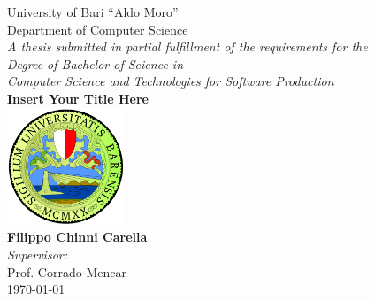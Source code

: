 \documentclass[12pt,twoside]{book}
\begin{document}

\frontmatter

\begin{titlepage}


\begin{center}
{\LARGE University of Bari ``Aldo Moro''}\\[0.25cm]
{\Large Department of Computer Science}\\[1cm]
{\large \emph{A thesis submitted in partial fulfillment of the requirements for the\\Degree of Bachelor of Science in\\Computer Science and Technologies for Software Production}}\\[2.5cm]
\linespread{1.2}\huge {\bfseries Insert Your Title Here}\\[1.5cm]
\linespread{1}
\includegraphics[width=3.5cm]{images/uniba-logo.png}\\[1.5cm]
{\Large\bf Filippo Chinni Carella}\\[1cm]
\large \emph{Supervisor:}\\
Prof. Corrado Mencar\\[1cm] 
\vspace{\fill}
\today
\end{center}

\end{titlepage}


\end{document}
